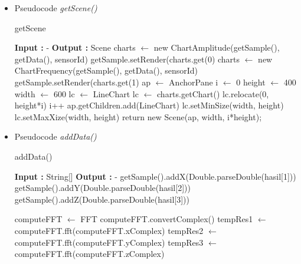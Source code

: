 \begin{itemize}

    \item Pseudocode \textit{getScene()}
    
    \begin{algorithm}
        \caption{getScene}
        \label{alg:getScene}
        \begin{algorithmic}[1]
            \State \textbf{Input :} - 
            \State \textbf{Output :} Scene
                \State charts $\leftarrow$ new ChartAmplitude(getSample(), getData(), sensorId)
                \State getSample.setRender(charts.get(0)
                \State charts $\leftarrow$ new ChartFrequency(getSample(), getData(), sensorId)
                \State getSample.setRender(charts.get(1)
                \State ap $\leftarrow$ AnchorPane
                \State i $\leftarrow$ 0
                \State height $\leftarrow$ 400
                \State width $\leftarrow$ 600
                    \State lc $\leftarrow$ LineChart
                    \State lc $\leftarrow$ charts.getChart()
                    \State lc.relocate(0, height*i)
                    \State i++
                    \State ap.getChildren.add(LineChart)
                    \State lc.setMinSize(width, height)
                    \State lc.setMaxXize(width, height)
                \EndFor
                \State return new Scene(ap, width, i*height);
            \EndFunction
        \end{algorithmic}
    \end{algorithm}
    
    \pagebreak
    \item Pseudocode \textit{addData()}
    
    \begin{algorithm}
        \caption{addData()}
        \label{alg:addData}
        \begin{algorithmic}[1]
            \State \textbf{Input :} String[]
            \State \textbf{Output :} -
                    \State getSample().addX(Double.parseDouble(hasil[1]))
                    \State getSample().addY(Double.parseDouble(hasil[2]))
                    \State getSample().addZ(Double.parseDouble(hasil[3]))
                    
                    \State computeFFT $\leftarrow$ FFT
                    \State computeFFT.convertComplex()
                    \State tempRes1 $\leftarrow$ computeFFT.fft(computeFFT.xComplex)
                    \State tempRes2 $\leftarrow$ computeFFT.fft(computeFFT.yComplex)
                    \State tempRes3 $\leftarrow$ computeFFT.fft(computeFFT.zComplex)
                    

\end{algorithmic}
\end{algorithm}
\end{itemize}
